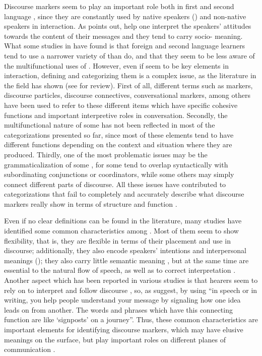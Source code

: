 \documentclass[output=paper]{langsci/langscibook}
\begin{document}
Discourse markers seem to play an important role both in first and second language , since they are constantly used by native speakers () and non-native speakers in interaction. As \citet{Yates2011} points out,  help one interpret the speakers’ attitudes towards the content of their messages and they tend to carry socio- meaning. What some studies in  have found is that foreign and second language learners tend to use a narrower variety of  than  do, and that they seem to be less aware of the multifunctional uses of  \citep{Vanda2007,Yates2011}. However, even if  seem to be key elements in interaction, defining and categorizing them is a complex issue, as the literature in the field has shown (see \citealt{Fischer2006} for review). First of all, different terms such as  markers, discourse particles, discourse connectives, conversational markers, among others have been used to refer to these different  items which have specific cohesive functions and important interpretive roles in conversation. Secondly, the multifunctional nature of some  has not been reflected in most of the categorizations presented so far, since most of these elements tend to have different functions depending on the context and situation where they are produced. Thirdly, one of the most problematic issues may be the grammaticalization of some , for some tend to overlap syntactically with subordinating conjunctions or coordinators, while some others may simply connect different parts of discourse. All these issues have contributed to categorizations that fail to completely and accurately describe what discourse markers really show in terms of structure and function \citep{Fischer2014}. 

Even if no clear definitions can be found in the literature, many studies have identified some common characteristics among . Most of them seem to show flexibility, that is, they are flexible in terms of their placement and use in discourse; additionally, they also encode speakers’ intentions and interpersonal meanings (\citealt{CarterMcCarthy2006}); they also carry little semantic meaning \citep{Schiffrin1987}, but at the same time are essential to the natural flow of speech, as well as to correct interpretation \citep{Neary-Sundquist2013}. Another aspect which has been reported in various studies is that hearers seem to rely on  to interpret and follow discourse \citep{Blakemore1992,Aijmer1996}, so, as  \citep[156]{Leech1975} suggest, by using  “in speech or in writing, you help people understand your message by signaling how one idea leads on from another. The words and phrases which have this connecting function are like ‘signposts’ on a journey”. Thus, these common characteristics are important elements for identifying discourse markers, which may have elusive  meanings on the surface, but play important roles on different planes of communication \citep{Schiffrin1987}.
\end{document}
